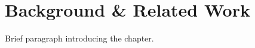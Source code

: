 \chapter{Background \& Related Work}
\label{chap:background}

Brief paragraph introducing the chapter.
